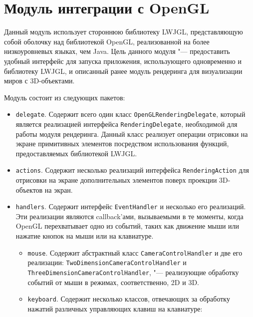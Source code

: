 \section{Модуль интеграции с OpenGL}

Данный модуль использует стороннюю библиотеку LWJGL, представляющую собой оболочку над библиотекой OpenGL, реализованной
на более низкоуровневых языках, чем Java. Цель данного модуля "--- предоставить удобный интерфейс для запуска
приложения, использующего одновременно и библиотеку LWJGL, и описанный ранее модуль рендеринга для визуализации миров с
3D-объектами.

Модуль состоит из следующих пакетов:

\begin{itemize}

\item \texttt{delegate}. Содержит всего один класс \texttt{OpenGLRenderingDelegate}, который является реализацией
интерфейса \texttt{RenderingDelegate}, необходимой для работы модуля рендеринга. Данный класс реализует операции
отрисовки на экране примитивных элементов посредством использования функций, предоставляемых библиотекой LWJGL.

\item \texttt{actions}. Содержит несколько реализаций интерфейса \texttt{RenderingAction} для отрисовки на экране
дополнительных элементов поверх проекции 3D-объектов на экран.

\item \texttt{handlers}. Содержит интерфейс \texttt{EventHandler} и несколько его реализаций. Эти реализации являются
callback'ами, вызываемыми в те моменты, когда OpenGL перехватывает одно из событий, таких как движение мыши или нажатие
кнопок на мыши или на клавиатуре.

    \begin{itemize}

    \item \texttt{mouse}. Содержит абстрактный класс \texttt{CameraControlHandler} и две его реализации:
    \texttt{TwoDimensionCameraControlHandler} и \texttt{ThreeDi\-mensionCamera\-ControlHandler}, "--- реализующие обработку
    событий от мыши в режимах, соответственно, 2D и 3D.

    \item \texttt{keyboard}. Содержит несколько классов, отвечающих за обработку нажатий различных управляющих клавиш на
    клавиатуре:


\end{itemize}
\end{itemize}
